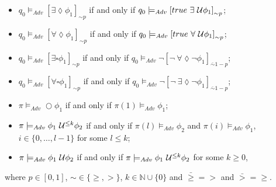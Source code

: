 \begin{defi}
\begin{itemize}
    \item{$q_{0}\models_{Adv}\left[\exists\lozenge\phi_{1}\right]_{\sim p}$ if and only if $q_{0}\models_{Adv} \left[true\ \exists\until \phi_{1}\right]_{\sim p}$;}
    \item{$q_{0}\models_{Adv}\left[\forall\lozenge\phi_{1}\right]_{\sim p}$ if and only if $q_{0}\models_{Adv}\left[true\ \forall\until \phi_{1}\right]_{\sim p}$;}

    \item{$q_{0}\models_{Adv}\left[\exists\square\phi_{1}\right]_{\sim p}$ if and only if $q_{0}\models_{Adv} \lnot \left[\lnot\ \forall\lozenge\lnot \phi_{1}\right]_{\bar{\sim} 1-p}$;}
    \item{$q_{0}\models_{Adv}\left[\forall\square\phi_{1}\right]_{\sim p}$ if and only if $q_{0}\models_{Adv} \lnot \left[\lnot\ \exists\lozenge\lnot \phi_{1}\right]_{\bar{\sim} 1-p}$;}

    \item{$\pi\models_{Adv} \bigcirc\phi_{1}$ if and only if $\pi(1)\models_{Adv}\phi_{1}$;}
    \item{$\pi\models_{Adv} \phi_{1}\ \mathcal{U}^{\leq k}\phi_{2}$ if and only if $\pi(l)\models_{Adv}\phi_{2}$ and $\pi(i)\models_{Adv}\phi_{1}$, $i\in\{0,\ldots,l-1\}$ for some $l\leq k$;}
    \item{$\pi\models_{Adv}\phi_{1}\ \mathcal{U}\phi_{2}$ if and only if $\pi\models_{Adv} \phi_{1}\ \mathcal{U}^{\leq k}\phi_{2}$ for some $k\geq 0$,}
\end{itemize}
where $p\in[0,1]$, $\sim\in\{\geq,>\}$, $k\in\mathbb{N}\cup\{0\}$ and $\bar{\geq}=>$ and $\bar{>}=\geq$.
\end{defi}


